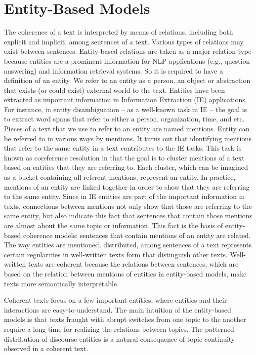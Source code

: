 \chapter{Entity-Based Models}
\label{chapt:entity_based_models}
%
The coherence of a text is interpreted by means of relations, including both explicit and implicit, among sentences of a text. 
Various types of relations may exist between sentences. 
Entity-based relations are taken as a major relation type because entities are a prominent information for NLP applications (e.g., question answering) and information retrieval systems. 
So it is required to have a definition of an entity.
We refer to an entity as a person, an object or abstraction that exists (or could exist) external world to the text. 
Entities have been extracted as important information in Information Extraction (IE) applications. 
For instance, in entity disambiguation -- as a well-known task in IE -- the goal is to extract word spans that refer to either a person, organization, time, and etc. 
Pieces of a text that we use to refer to an entity are named mentions. 
Entity can be referred to in various ways by mentions. 
It turns out that identifying mentions that refer to the same entity in a text contributes to the IE tasks. 
This task is known as coreference resolution in that the goal is to cluster mentions of a text based on entities that they are referring to.  
Each cluster, which can be imagined as a bucket containing all referent mentions, represent an entity. 
In practice, mentions of an entity are linked together in order to show that they are referring to the same entity. 
Since in IE entities are part of the important information in texts, connections between mentions not only show that those are referring to the same entity, but also indicate this fact that sentences that contain those mentions are almost about the same topic or information. 
This fact is the basis of entity-based coherence models: sentences that contain mentions of an entity are related. 
The way entities are mentioned, distributed, among sentences of a text represents certain regularities in well-written texts form that distinguish other texts. 
Well-written texts are coherent because the relations between sentences, which are based on the relation between mentions of entities in entity-based models, make texts more semantically interpretable. 


Coherent texts focus on a few important entities, where entities and their interactions are easy-to-understand.  
The main intuition of the entity-based models is that texts fraught with abrupt switches from one topic to the another require a long time for realizing the relations between topics. 
The patterned distribution of discourse entities is a natural consequence of topic continuity observed in a coherent text. 

